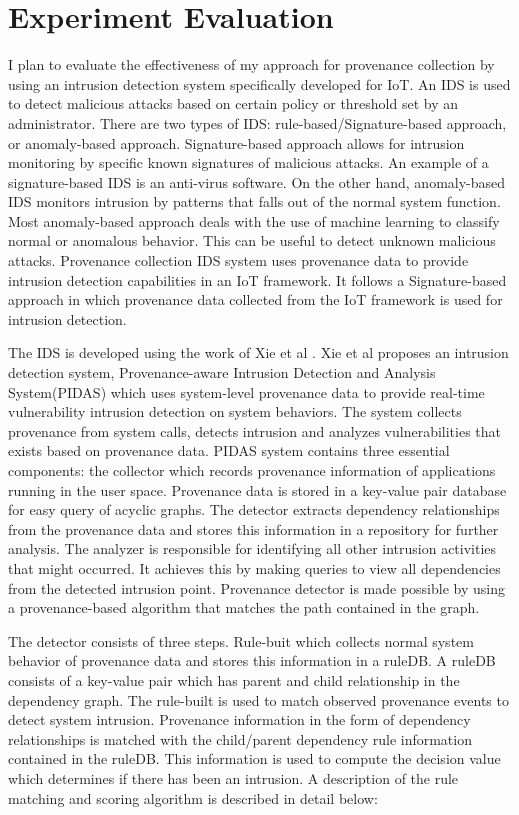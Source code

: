 \section{Experiment Evaluation}

I plan to evaluate the effectiveness of my approach for provenance collection by using an intrusion detection system specifically developed for IoT. An IDS is used to detect malicious attacks based on certain policy or threshold set by an administrator. There are two types of  IDS: rule-based/Signature-based approach, or anomaly-based approach. Signature-based approach allows for intrusion monitoring by specific known signatures of malicious attacks. An example of a signature-based IDS is an anti-virus software. On the other hand, anomaly-based IDS monitors intrusion by patterns that falls out of the normal system function. Most anomaly-based approach deals with the use of machine learning to classify normal or anomalous behavior. This can be useful to detect unknown malicious attacks. Provenance collection IDS system uses provenance data to provide intrusion detection capabilities in an IoT framework. It follows a Signature-based approach in which provenance data collected from the IoT framework is used for intrusion detection. 
\par The IDS is developed using the work of Xie et al \cite{Xie:2016:UID:2936026.2936232}. Xie et al proposes an intrusion detection system, Provenance-aware Intrusion Detection and Analysis System(PIDAS) which uses system-level provenance data to provide real-time vulnerability intrusion detection on system behaviors. The system collects provenance from system calls, detects intrusion and analyzes vulnerabilities that exists based on provenance data. PIDAS system contains three essential components: the collector which records provenance information of applications running in the user space. Provenance data is stored in a key-value pair database for easy query of acyclic graphs. The detector extracts dependency relationships from the provenance data and stores this information in a repository for further analysis. The analyzer is responsible for identifying all other intrusion activities that might occurred. It achieves this by making queries to view all dependencies from the detected intrusion point. Provenance detector is made possible by using a provenance-based algorithm that matches the path contained in the graph.


The detector consists of three steps. Rule-buit which collects normal system behavior of provenance data and stores this information in a ruleDB. A ruleDB consists of a key-value pair which has parent and child relationship in the dependency graph. The rule-built is used to match observed provenance events  to detect system intrusion. Provenance information in the form of dependency relationships is matched with the child/parent dependency rule information contained in the ruleDB. This information is used to compute the decision value which determines if there has been an intrusion.  A description of the rule matching and scoring algorithm is described in detail below: 

